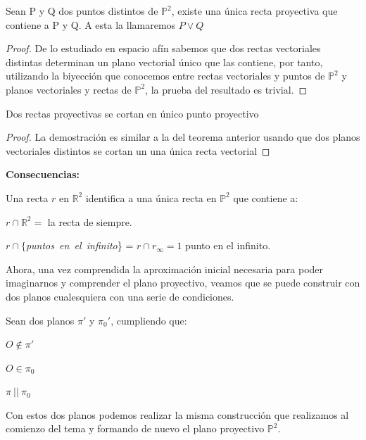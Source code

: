 \begin{nth}
Sean P y Q dos puntos distintos de $\mathbb{P}^2$, existe una única recta proyectiva que contiene a P y Q. A esta la llamaremos $P \vee Q$
\end{nth}
\begin{proof}

De lo estudiado en espacio afín sabemos que dos rectas vectoriales distintas determinan un plano vectorial único que las contiene, por tanto, utilizando la biyección que conocemos entre rectas vectoriales y puntos de $\mathbb{P}^2$ y planos vectoriales y rectas de $\mathbb{P}^2$, la prueba del resultado es trivial.
\end{proof}

\begin{nth}
Dos rectas proyectivas se cortan en único  punto proyectivo
\end{nth}
\begin{proof}
La demostración es similar a la del teorema anterior usando que dos planos vectoriales distintos se cortan un una única recta vectorial
\end{proof}

\textbf{Consecuencias:}

Una recta $r$ en $\mathbb{R}^2$ identifica a una única recta en $\mathbb{P}^2$ que contiene a:
\begin{nlist}

	\item $r \cap \mathbb{R}^2 =$ la recta de siempre.
	\item $r \cap \{$\textit{puntos\ en\ el\ infinito}\} = $r \cap r_\infty = 1$ punto en el infinito.

\end{nlist}

Ahora, una vez comprendida la aproximación inicial necesaria para poder imaginarnos y comprender el plano proyectivo, veamos que se puede construir con dos planos cualesquiera con una serie de condiciones.


Sean dos planos $\pi'$ y $\pi_0'$, cumpliendo que:
\begin{nlist}
	\item $O \notin \pi'$
	\item $O \in \pi_0$
	\item $\pi\ ||\ \pi_0$
\end{nlist}
Con estos dos planos podemos realizar la misma construcción que realizamos al comienzo del tema y formando de nuevo el plano proyectivo $\mathbb{P}^2$.

